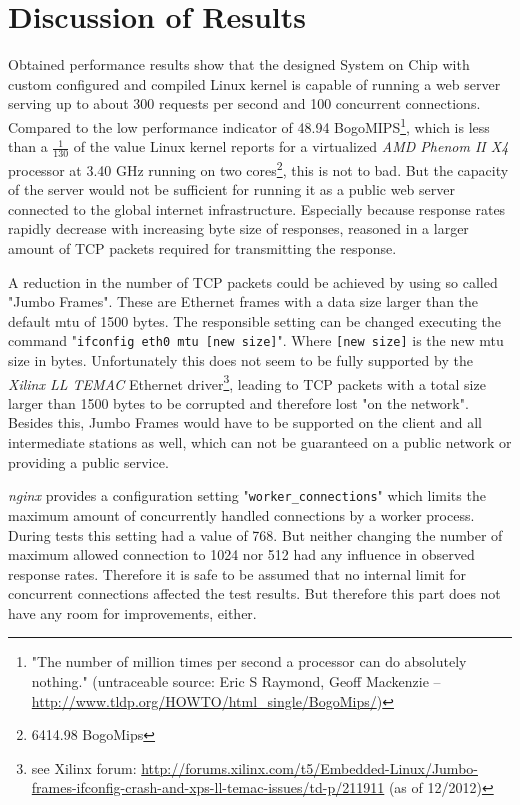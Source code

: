 \section{Discussion of Results}

Obtained performance results show that the designed System on Chip with custom configured and compiled Linux kernel is capable of running a web server serving up to about 300 requests per second and 100 concurrent connections. Compared to the low performance indicator of 48.94 BogoMIPS\footnote{"The number of million times per second a processor can do absolutely nothing." (untraceable source: Eric S Raymond, Geoff Mackenzie -- \url{http://www.tldp.org/HOWTO/html\_single/BogoMips/})}, which is less than a $\frac{1}{130}$ of the value Linux kernel reports for a virtualized \textit{AMD Phenom II X4} processor at 3.40 GHz running on two cores\footnote{6414.98 BogoMips}, this is not to bad. But the capacity of the server would not be sufficient for running it as a public web server connected to the global internet infrastructure. Especially because response rates rapidly decrease with increasing byte size of responses, reasoned in a larger amount of TCP packets required for transmitting the response.

A reduction in the number of TCP packets could be achieved by using so called "Jumbo Frames". These are Ethernet frames with a data size larger than the default \gls{mtu} of 1500 bytes. The responsible setting can be changed executing the command "\texttt{ifconfig eth0 mtu [new size]}". Where \texttt{[new size]} is the new \gls{mtu} size in bytes. Unfortunately this does not seem to be fully supported by the \textit{Xilinx LL TEMAC} Ethernet driver\footnote{see Xilinx forum: \url{http://forums.xilinx.com/t5/Embedded-Linux/Jumbo-frames-ifconfig-crash-and-xps-ll-temac-issues/td-p/211911} (as of 12/2012)}, leading to TCP packets with a total size larger than 1500 bytes to be corrupted and therefore lost "on the network". Besides this, Jumbo Frames would have to be supported on the client and all intermediate stations as well, which can not be guaranteed on a public network or providing a public service.

\textit{nginx} provides a configuration setting "\texttt{worker\_connections}" which limits the maximum amount of concurrently handled connections by a worker process. During tests this setting had a value of 768. But neither changing the number of maximum allowed connection to 1024 nor 512 had any influence in observed response rates. Therefore it is safe to be assumed that no internal limit for concurrent connections affected the test results. But therefore this part does not have any room for improvements, either.

